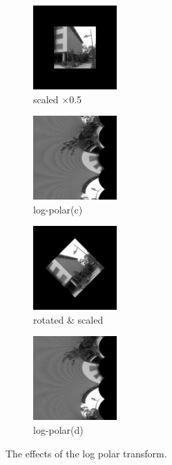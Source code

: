\begin{figure}[t!]
         \begin{subfigure}[b]{3.4cm}
                \includegraphics[width=3.2cm]{images/pc/scaled}
                \caption{scaled $\times$0.5}
                \label{fig:PCSecOrig2}
        \end{subfigure}%
        \begin{subfigure}[b]{3.4cm}
                \includegraphics[width=3.2cm]{images/pc/logpolarScale}
                \caption{log-polar(c)}
                \label{fig:PCSecLP}
        \end{subfigure}%
                \begin{subfigure}[b]{3.4cm}
                \includegraphics[width=3.2cm]{images/pc/rotationscale}
                \caption{rotated \& scaled}
                \label{fig:PCSecRot}
        \end{subfigure}%
        \begin{subfigure}[b]{3.4cm}
                \includegraphics[width=3.2cm]{images/pc/logpolarRotationScale}
                \caption{log-polar(d)}
                \label{fig:PCSecLPR}
        \end{subfigure}%
       \caption{The effects of the log polar transform.}\label{fig:PCSecB}
\end{figure}

